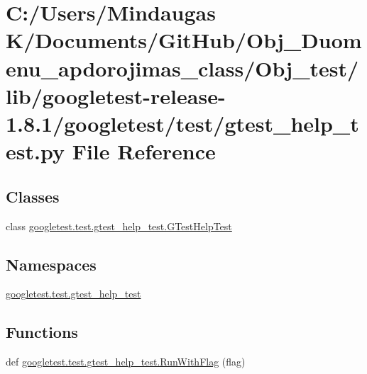 \hypertarget{_obj__test_2lib_2googletest-release-1_88_81_2googletest_2test_2gtest__help__test_8py}{}\section{C\+:/\+Users/\+Mindaugas K/\+Documents/\+Git\+Hub/\+Obj\+\_\+\+Duomenu\+\_\+apdorojimas\+\_\+class/\+Obj\+\_\+test/lib/googletest-\/release-\/1.8.1/googletest/test/gtest\+\_\+help\+\_\+test.py File Reference}
\label{_obj__test_2lib_2googletest-release-1_88_81_2googletest_2test_2gtest__help__test_8py}
\subsection*{Classes}
\begin{DoxyCompactItemize}
\item 
class \mbox{\hyperlink{classgoogletest_1_1test_1_1gtest__help__test_1_1_g_test_help_test}{googletest.\+test.\+gtest\+\_\+help\+\_\+test.\+G\+Test\+Help\+Test}}
\end{DoxyCompactItemize}
\subsection*{Namespaces}
\begin{DoxyCompactItemize}
\item 
 \mbox{\hyperlink{namespacegoogletest_1_1test_1_1gtest__help__test}{googletest.\+test.\+gtest\+\_\+help\+\_\+test}}
\end{DoxyCompactItemize}
\subsection*{Functions}
\begin{DoxyCompactItemize}
\item 
def \mbox{\hyperlink{namespacegoogletest_1_1test_1_1gtest__help__test_a8a458d794d12c66871ed04be8a587b9e}{googletest.\+test.\+gtest\+\_\+help\+\_\+test.\+Run\+With\+Flag}} (flag)
\end{DoxyCompactItemize}

